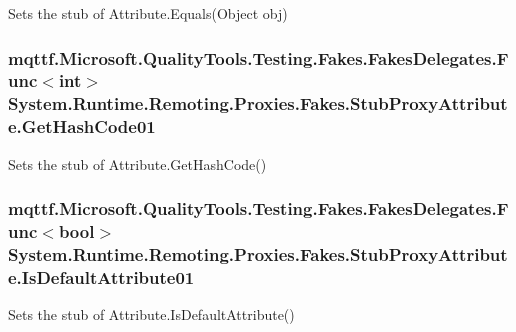 Sets the stub of Attribute.\-Equals(\-Object obj)

\hypertarget{class_system_1_1_runtime_1_1_remoting_1_1_proxies_1_1_fakes_1_1_stub_proxy_attribute_af8828422f0e5d05535b588913f5fe719}{
\subsubsection[{Get\-Hash\-Code01}]{\setlength{\rightskip}{0pt plus 5cm}mqttf.\-Microsoft.\-Quality\-Tools.\-Testing.\-Fakes.\-Fakes\-Delegates.\-Func$<$int$>$ System.\-Runtime.\-Remoting.\-Proxies.\-Fakes.\-Stub\-Proxy\-Attribute.\-Get\-Hash\-Code01}}\label{class_system_1_1_runtime_1_1_remoting_1_1_proxies_1_1_fakes_1_1_stub_proxy_attribute_af8828422f0e5d05535b588913f5fe719}


Sets the stub of Attribute.\-Get\-Hash\-Code()

\hypertarget{class_system_1_1_runtime_1_1_remoting_1_1_proxies_1_1_fakes_1_1_stub_proxy_attribute_a482344f4e042b9cac25b9eaa2c33d675}{
\subsubsection[{Is\-Default\-Attribute01}]{\setlength{\rightskip}{0pt plus 5cm}mqttf.\-Microsoft.\-Quality\-Tools.\-Testing.\-Fakes.\-Fakes\-Delegates.\-Func$<$bool$>$ System.\-Runtime.\-Remoting.\-Proxies.\-Fakes.\-Stub\-Proxy\-Attribute.\-Is\-Default\-Attribute01}}\label{class_system_1_1_runtime_1_1_remoting_1_1_proxies_1_1_fakes_1_1_stub_proxy_attribute_a482344f4e042b9cac25b9eaa2c33d675}


Sets the stub of Attribute.\-Is\-Default\-Attribute()

